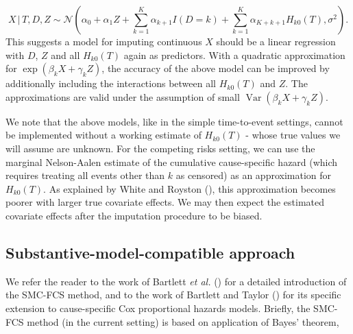 \documentclass[
  letterpaper,
  DIV=11,
  numbers=noendperiod]{scrreprt}
\DeclareMathOperator{\Var}{Var}
\newcommand{\given}{\,|\,}
\begin{document}
\begin{equation*}
    X \given T, D, Z \sim \mathcal{N}(\alpha_0 + \alpha_1 Z + \sum^K_{k = 1} \alpha_{k+1} I(D=k) + \sum^K_{k = 1} \alpha_{K + k + 1} H_{k0}(T),\sigma^2).
\end{equation*} This suggests a model for imputing continuous \(X\)
should be a linear regression with \(D\), \(Z\) and all \(H_{k0}(T)\)
again as predictors. With a quadratic approximation for
\(\exp(\beta_k X + \gamma_k Z)\), the accuracy of the above model can be
improved by additionally including the interactions between all
\(H_{k0}(T)\) and \(Z\). The approximations are valid under the
assumption of small \(\Var(\beta_k X + \gamma_k Z)\).

We note that the above models, like in the simple time-to-event
settings, cannot be implemented without a working estimate of
\(H_{k0}(T)\) - whose true values we will assume are unknown. For the
competing risks setting, we can use the marginal Nelson-Aalen estimate
of the cumulative cause-specific hazard (which requires treating all
events other than \(k\) as censored) as an approximation for
\(H_{k0}(T)\). As explained by White and Royston
(), this
approximation becomes poorer with larger true covariate effects. We may
then expect the estimated covariate effects after the imputation
procedure to be biased.

\subsection{Substantive-model-compatible
approach}\label{sec-smcfcs-theory}

We refer the reader to the work of Bartlett \emph{et al.}
() for a
detailed introduction of the SMC-FCS method, and to the work of Bartlett
and Taylor ()
for its specific extension to cause-specific Cox proportional hazards
models. Briefly, the SMC-FCS method (in the current setting) is based on
application of Bayes' theorem,
\end{document}
